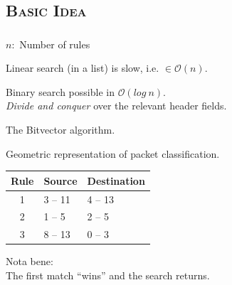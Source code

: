 \documentclass[xcolor=x11names,compress]{beamer}
\renewcommand{\(}{\begin{columns}}
\renewcommand{\)}{\end{columns}}
\newcommand{\<}[1]{\begin{column}{#1}}
\renewcommand{\>}{\end{column}}
\begin{document}
\subsection{\scshape Basic Idea}
\begin{frame}
  \frametitle{\insertsubsection}
  $n:$ Number of rules
  \begin{tcolorbox}[colback=red!5!white,colframe=red!75!black,title=Problem,drop fuzzy shadow]
  Linear search (in a list) is slow, i.e. $\in \mathcal O(n)$.
  \end{tcolorbox}
  \pause
  \begin{tcolorbox}[colback=teal!5!white,colframe=teal!75!black,title=Idea,drop fuzzy shadow]
  Binary search possible in $\mathcal O(log\ n)$.\\
  \textit{Divide and conquer} over the relevant header fields.
  \end{tcolorbox}
  \pause
  \begin{tcolorbox}[colback=blue!5!white,colframe=blue!75!black,title=Possible solution,drop fuzzy shadow]
  The Bitvector algorithm.
  \end{tcolorbox}
\end{frame}

\begin{frame}
  Geometric representation of packet classification.
  \pause
  \begin{table}
  \centering
  \begin{tabularx}{0.7\textwidth}{c|X|X}
  Rule&Source&Destination\\
  \hline
  1&3 -- 11&4 -- 13\\
  2&1 -- 5&2 -- 5\\
  3&8 -- 13&0 -- 3\\
  \end{tabularx}
  \end{table}
  Nota bene:\\
  The first match \enquote{wins} and the search returns.
\end{frame}
\end{document}
